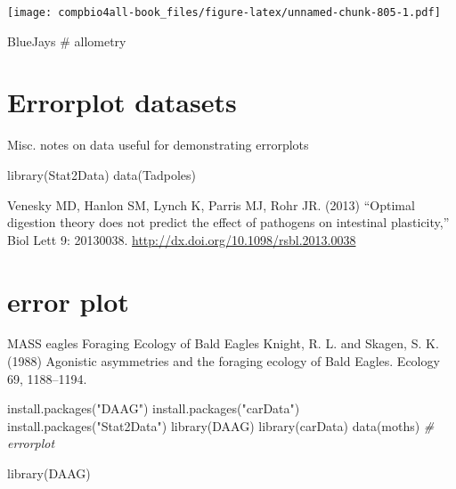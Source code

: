 \documentclass[
]{book}
\newenvironment{Shaded}{\begin{snugshade}}{\end{snugshade}}
\newcommand{\CommentTok}[1]{\textcolor[rgb]{0.56,0.35,0.01}{\textit{#1}}}
\newcommand{\FunctionTok}[1]{\textcolor[rgb]{0.00,0.00,0.00}{#1}}
\newcommand{\NormalTok}[1]{#1}
\newcommand{\StringTok}[1]{\textcolor[rgb]{0.31,0.60,0.02}{#1}}
\begin{document}
\texttt{[image: compbio4all-book\_files/figure-latex/unnamed-chunk-805-1.pdf]}

BlueJays \# allometry

\hypertarget{errorplot-datasets}{%
\chapter{Errorplot datasets}\label{errorplot-datasets}}

Misc. notes on data useful for demonstrating errorplots

\begin{Shaded}
\begin{Highlighting}[]
\FunctionTok{library}\NormalTok{(Stat2Data)}
\FunctionTok{data}\NormalTok{(Tadpoles)}
\end{Highlighting}
\end{Shaded}

Venesky MD, Hanlon SM, Lynch K, Parris MJ, Rohr JR. (2013) ``Optimal digestion theory does not predict the effect of pathogens on intestinal plasticity,'' Biol Lett 9: 20130038. \url{http://dx.doi.org/10.1098/rsbl.2013.0038}

\hypertarget{error-plot}{%
\chapter{error plot}\label{error-plot}}

MASS eagles Foraging Ecology of Bald Eagles
Knight, R. L. and Skagen, S. K. (1988) Agonistic asymmetries and the foraging ecology of Bald Eagles. Ecology 69, 1188--1194.

\begin{Shaded}
\begin{Highlighting}[]
\FunctionTok{install.packages}\NormalTok{(}\StringTok{"DAAG"}\NormalTok{)}
\FunctionTok{install.packages}\NormalTok{(}\StringTok{"carData"}\NormalTok{)}
\FunctionTok{install.packages}\NormalTok{(}\StringTok{"Stat2Data"}\NormalTok{)}
\FunctionTok{library}\NormalTok{(DAAG)}
\FunctionTok{library}\NormalTok{(carData)}
\FunctionTok{data}\NormalTok{(moths) }\CommentTok{\# errorplot}
\end{Highlighting}
\end{Shaded}

\begin{Shaded}
\begin{Highlighting}[]
\FunctionTok{library}\NormalTok{(DAAG)}
\end{Highlighting}
\end{Shaded}
\end{document}
